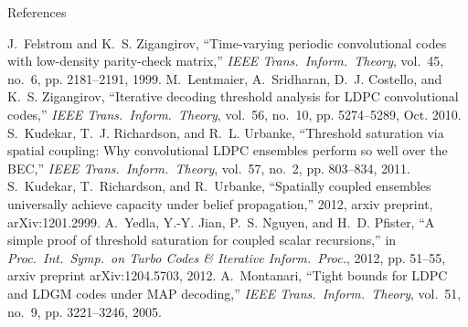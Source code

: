 \documentclass{beamer}
\newlength{\threecolwid}
\begin{document}
\begin{columns}[t]
\begin{column}{\threecolwid}
\begin{block}{References}
      \begin{thebibliography}{10}
        \vspace{1cm}
        J.~Felstrom and K.~S. Zigangirov, ``Time-varying periodic convolutional codes
        with low-density parity-check matrix,'' \emph{IEEE Trans.\ Inform.\ Theory},
        vol.~45, no.~6, pp. 2181--2191, 1999.
        \vspace{1cm}
        M.~Lentmaier, A.~Sridharan, D.~J. Costello, and K.~S. Zigangirov, ``Iterative
        decoding threshold analysis for {LDPC} convolutional codes,'' \emph{IEEE
          Trans.\ Inform.\ Theory}, vol.~56, no.~10, pp. 5274--5289, Oct. 2010.
        \vspace{1cm}
        S.~Kudekar, T.~J. Richardson, and R.~L. Urbanke, ``Threshold saturation via
        spatial coupling: {W}hy convolutional {LDPC} ensembles perform so well over
        the {BEC},'' \emph{IEEE Trans.\ Inform.\ Theory}, vol.~57, no.~2, pp.
        803--834, 2011.
        \vspace{1cm}
        S.~Kudekar, T.~Richardson, and R.~Urbanke, ``Spatially coupled ensembles
        universally achieve capacity under belief propagation,'' 2012, arxiv preprint,
        arXiv:1201.2999.
        \vspace{1cm}
        A.~Yedla, Y.-Y. Jian, P.~S. Nguyen, and H.~D. Pfister, ``A simple proof of
        threshold saturation for coupled scalar recursions,'' in \emph{Proc.\ Int.\
          Symp.\ on Turbo Codes \& Iterative Inform.\ Proc.}, 2012, pp. 51--55, arxiv
        preprint arXiv:1204.5703, 2012.
        \vspace{1cm}
        A.~Montanari, ``Tight bounds for {LDPC} and {LDGM} codes under {MAP}
        decoding,'' \emph{IEEE Trans.\ Inform.\ Theory}, vol.~51, no.~9, pp.
        3221--3246, 2005.
      \end{thebibliography}
    \end{block}
  \end{column}
\end{columns}
\end{document}
